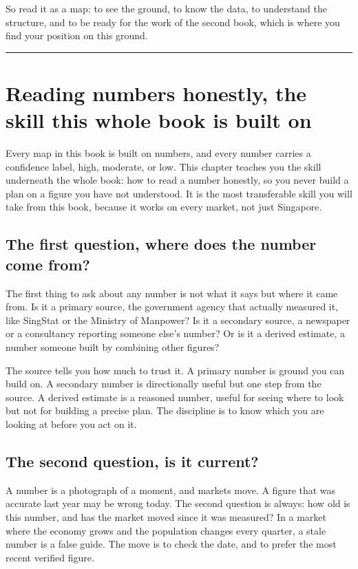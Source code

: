 \documentclass[10pt,twoside,openany]{memoir}
\newcommand{\needspacehead}{\needspace{4\baselineskip}}
\let\oldsection\section
\renewcommand{\section}{\needspacehead\oldsection}
\begin{document}
So read it as a map: to see the ground, to know the data, to understand
the structure, and to be ready for the work of the second book, which is
where you find your position on this ground.

\begin{center}\rule{0.5\linewidth}{0.5pt}\end{center}

\FloatBarrier
\chapter{Reading numbers honestly, the skill this whole book is built
on}\label{reading-numbers-honestly-the-skill-this-whole-book-is-built-on}

Every map in this book is built on numbers, and every number carries a
confidence label, high, moderate, or low. This chapter teaches you the
skill underneath the whole book: how to read a number honestly, so you
never build a plan on a figure you have not understood. It is the most
transferable skill you will take from this book, because it works on
every market, not just Singapore.

\section{The first question, where does the number come
from?}\label{the-first-question-where-does-the-number-come-from}

The first thing to ask about any number is not what it says but where it
came from. Is it a primary source, the government agency that actually
measured it, like SingStat or the Ministry of Manpower? Is it a
secondary source, a newspaper or a consultancy reporting someone else's
number? Or is it a derived estimate, a number someone built by combining
other figures?

The source tells you how much to trust it. A primary number is ground
you can build on. A secondary number is directionally useful but one
step from the source. A derived estimate is a reasoned number, useful
for seeing where to look but not for building a precise plan. The
discipline is to know which you are looking at before you act on it.

\section{The second question, is it
current?}\label{the-second-question-is-it-current}

A number is a photograph of a moment, and markets move. A figure that
was accurate last year may be wrong today. The second question is
always: how old is this number, and has the market moved since it was
measured? In a market where the economy grows and the population changes
every quarter, a stale number is a false guide. The move is to check the
date, and to prefer the most recent verified figure.
\end{document}
